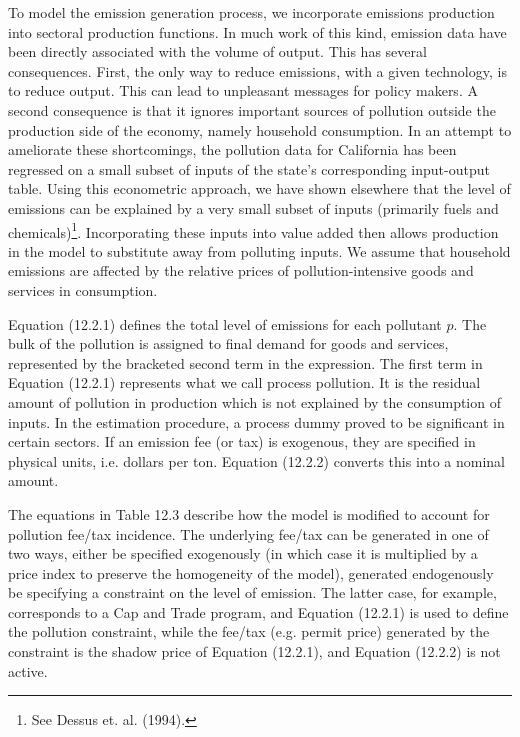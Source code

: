 \documentclass[12pt]{article}
\begin{document}
To model the emission generation process, we incorporate emissions production into sectoral production functions. In much work of this kind, emission data have been directly associated with the volume of output. This has several consequences. First, the only way to reduce emissions, with a given technology, is to reduce output. This can lead to unpleasant messages for policy makers. A second consequence is that it ignores important sources of pollution outside the production side of the economy, namely household consumption. In an attempt to ameliorate these shortcomings, the pollution data for California has been regressed on a small subset of inputs of the state's corresponding input-output table. Using this econometric approach, we have shown elsewhere that the level of emissions can be explained by a very small subset of inputs (primarily fuels and chemicals)\footnote{See Dessus et. al. (1994).}. Incorporating these inputs into value added then allows production in the model to substitute away from polluting inputs. We assume that household emissions are affected by the relative prices of pollution-intensive goods and services in consumption.

Equation (12.2.1) defines the total level of emissions for each pollutant $p$. The bulk of the pollution is assigned to final demand for goods and services, represented by the bracketed second term in the expression. The first term in Equation (12.2.1) represents what we call process pollution. It is the residual amount of pollution in production which is not explained by the consumption of inputs. In the estimation procedure, a process dummy proved to be significant in certain sectors. If an emission fee (or tax) is exogenous, they are specified in physical units, i.e. dollars per ton. Equation (12.2.2) converts this into a nominal amount.

The equations in Table 12.3 describe how the model is modified to account for pollution fee/tax incidence. The underlying fee/tax can be generated in one of two ways, either be specified exogenously (in which case it is multiplied by a price index to preserve the homogeneity of the model), generated endogenously be specifying a constraint on the level of emission. The latter case, for example, corresponds to a Cap and Trade program, and Equation (12.2.1) is used to define the pollution constraint, while the fee/tax (e.g. permit price) generated by the constraint is the shadow price of Equation (12.2.1), and Equation (12.2.2) is not active.

\end{document}
